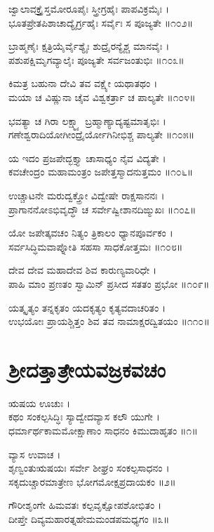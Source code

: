 ಜ್ವಾಲಾವಕ್ತ್ರೈಸ್ತಮೋರೂಪೈಃ ಸ್ತ್ರೀಗ್ರಹೈಃ ಪಾಪವಿಕ್ರಮೈಃ ।\\
ಭೂತಪ್ರೇತಪಿಶಾಚಾದ್ಯೈರ್ಗ್ರಹೈಃ ಸರ್ವೈಃ ಸ ಪೂಜ್ಯತೇ ॥೧೦೨॥

ಬ್ರಾಹ್ಮಣೈಃ ಕ್ಷತ್ರಿಯೈರ್ವೈಶ್ಯೈಃ ಶುದ್ರೈರನ್ಯೈಶ್ಚ ಮಾನವೈಃ ।\\
ಪಶುಪಕ್ಷಿಮೃಗವ್ಯಾಲೈಃ ಪೂಜ್ಯತೇ ಸರ್ವಜಂತುಭಿಃ ॥೧೦೩॥

ಕಿಮತ್ರ ಬಹುನಾ ದೇವಿ ತವ ವಕ್ಷ್ಯೇ ಯಥಾತಥಂ ।\\
ಮಯಾ ಚ ವಿಷ್ಣುನಾ ಚೈವ ವಿಶ್ವಕರ್ತ್ರಾ ಚ ಪಾಲ್ಯತೇ ॥೧೦೪॥

ಭವತ್ಯಾ ಚ ಗಿರಾ ಲಕ್ಷ್ಮ್ಯಾ ಬ್ರಹ್ಮಾಣ್ಯಾದ್ಯಷ್ಟಮಾತೃಭಿಃ ।\\
ಗಣೇಶ್ವರಾದಿಯೋಗೀಂದ್ರೈರ್ಯೋಗಿನೀಭಿಶ್ಚ ಪಾಲ್ಯತೇ ॥೧೦೫॥

ಯ ಇದಂ ಪ್ರಜಪೇದ್ಭಕ್ತ್ಯಾ ಚಾಸಾಧ್ಯಂ ನೈವ ವಿದ್ಯತೇ ।\\
ಕವಚೇಂದ್ರಂ ಮಹಾಮಂತ್ರಂ ಜಪೇತ್ತಸ್ಮಾದನುತ್ತಮಂ ॥೧೦೬॥

ಉಚ್ಚಾಟನೇ ಮರುದ್ವಕ್ತ್ರೋ ವಿದ್ವೇಷೇ ರಾಕ್ಷಸಾನನಃ ।\\
ಪ್ರಾಗಾನನೋಽಭಿವೃದ್ಧೌ ಚ ಸರ್ವೇಷ್ವೀಶಾನದಿಙ್ಮುಖಃ ॥೧೦೭॥

ಯೋ ಜಪೇತ್ಕವಚಂ ನಿತ್ಯಂ ತ್ರಿಕಾಲಂ ಧ್ಯಾನಪೂರ್ವಕಂ ।\\
ಸರ್ವಸಿದ್ಧಿಮವಾಪ್ನೋತಿ ಸಹಸಾ ಸಾಧಕೋತ್ತಮಃ ॥೧೦೮॥

ದೇವ ದೇವ ಮಹಾದೇವ ಶಿವ ಕಾರುಣ್ಯವಾರಿಧೇ ।\\
ಪಾಹಿ ಮಾಂ ಪ್ರಣತಂ ಸ್ವಾಮಿನ್ ಪ್ರಸೀದ ಸತತಂ ಪ್ರಭೋ ॥೧೦೯॥

ಯತ್ಕೃತ್ಯಂ ತನ್ನಕೃತಂ ಯದಕೃತ್ಯಂ ಕೃತ್ಯವದಾಚರಿತಂ ।\\
ಉಭಯೋಃ ಪ್ರಾಯಶ್ಚಿತ್ತಂ ಶಿವ ತವ ನಾಮಾಕ್ಷರದ್ವಿತಯಂ ॥೧೧೦॥


\section{ಶ್ರೀದತ್ತಾತ್ರೇಯವಜ್ರಕವಚಂ}
ಋಷಯ ಊಚುಃ ।\\
ಕಥಂ ಸಂಕಲ್ಪಸಿದ್ಧಿಃ ಸ್ಯಾದ್ವೇದವ್ಯಾಸ ಕಲೌ ಯುಗೇ ।\\
ಧರ್ಮಾರ್ಥಕಾಮಮೋಕ್ಷಾಣಾಂ ಸಾಧನಂ ಕಿಮುದಾಹೃತಂ ॥೧॥

ವ್ಯಾಸ ಉವಾಚ ।\\
ಶೃಣ್ವಂತುಋಷಯಃ ಸರ್ವೇ ಶೀಘ್ರಂ ಸಂಕಲ್ಪಸಾಧನಂ ।\\
ಸಕೃದುಚ್ಚಾರಮಾತ್ರೇಣ ಭೋಗಮೋಕ್ಷಪ್ರದಾಯಕಂ ॥೨॥

ಗೌರೀಶೃಂಗೇ ಹಿಮವತಃ ಕಲ್ಪವೃಕ್ಷೋಪಶೋಭಿತಂ ।\\
ದೀಪ್ತೇ ದಿವ್ಯಮಹಾರತ್ನಹೇಮಮಂಡಪಮಧ್ಯಗಂ ॥೩॥

